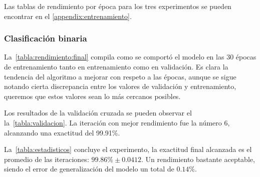 Las tablas de rendimiento por época para los tres experimentos se pueden
encontrar en el \autoref{appendix:entrenamiento}.

\subsubsection{Clasificación binaria}

La~\autoref{tabla:rendimiento:final} compila como se comportó el modelo en las
30 épocas de entrenamiento tanto en entrenamiento como en validación. Es clara
la tendencia del algoritmo a mejorar con respeto a las épocas, aunque se sigue
notando cierta discrepancia entre los valores de validación y entrenamiento,
queremos que estos valores sean lo más cercanos posibles.

Los resultados de la validación cruzada se pueden observar el
la~\autoref{tabla:validacion}. La iteración con mejor rendimiento fue la número
6, alcanzando una exactitud del 99.91\%.

\begin{table}[H]
    \centering
    \caption{Resultados de la validación cruzada binaria}\label{tabla:validacion}
    \end{table}

La~\autoref{tabla:estadisticos} concluye el experimento, la exactitud final
alcanzada es el promedio de las iteraciones: \(99.86\% \pm 0.0412\). Un
rendimiento bastante aceptable, siendo el error de generalización del modelo un
total de \( 0.14\% \).

